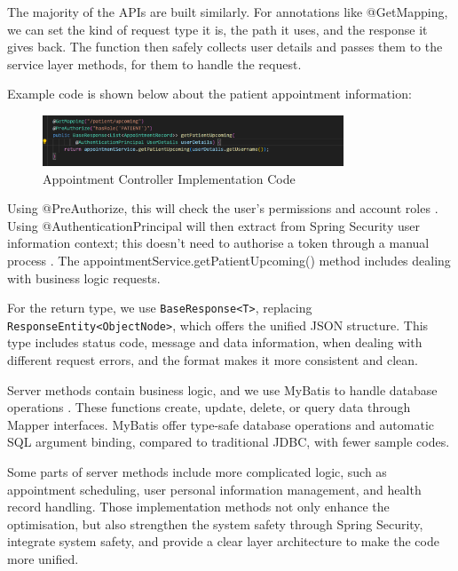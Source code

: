 The majority of the APIs are built similarly. For annotations like @GetMapping, we can set the kind of request type it is, the path it uses, and the response it gives back. The function then safely collects user details and passes them to the service layer methods, for them to handle the request.

Example code is shown below about the patient appointment information:

\begin{figure}[h]
\centering
\includegraphics[width=0.8\textwidth]{chapters/chapter03/images03/3-3-1-figure(API-I).png}
\caption{Appointment Controller Implementation Code}
\label{fig:appointment-controller}
\end{figure}

Using @PreAuthorize, this will check the user's permissions and account roles \cite{springsecurity2024}. Using @AuthenticationPrincipal will then extract from Spring Security user information context; this doesn't need to authorise a token through a manual process \cite{johnson2023}.
The appointmentService.getPatientUpcoming() method includes dealing with business logic requests.

For the return type, we use \texttt{BaseResponse<T>}, replacing \texttt{ResponseEntity<ObjectNode>}, which offers the unified JSON structure. This type includes status code, message and data information, when dealing with different request errors, and the format makes it more consistent and clean.

Server methods contain business logic, and we use MyBatis to handle database operations \cite{springsecurity2024}. These functions create, update, delete, or query data through Mapper interfaces. MyBatis offer type-safe database operations and automatic SQL argument binding, compared to traditional JDBC, with fewer sample codes.

Some parts of server methods include more complicated logic, such as appointment scheduling, user personal information management, and health record handling. Those implementation methods not only enhance the optimisation, but also strengthen the system safety through Spring Security, integrate system safety, and provide a clear layer architecture to make the code more unified.

